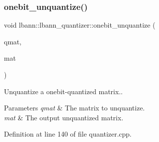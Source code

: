 \subsubsection{\texorpdfstring{onebit\+\_\+unquantize()}{onebit\_unquantize()}\hspace{0.1cm}{\footnotesize\ttfamily [1/2]}}
{\footnotesize\ttfamily void lbann\+::lbann\+\_\+quantizer\+::onebit\+\_\+unquantize (\begin{DoxyParamCaption}\item[{const \hyperlink{classlbann_1_1lbann__quantizer_a399f3f8c393b6021b43e95d1ce6ea28c}{Quantized\+Matrix} \&}]{qmat,  }\item[{\hyperlink{base_8hpp_a68f11fdc31b62516cb310831bbe54d73}{Mat} \&}]{mat }\end{DoxyParamCaption})}

Unquantize a onebit-\/quantized matrix.. 
\begin{DoxyParams}{Parameters}
{\em qmat} & The matrix to unquantize. \\
\hline
{\em mat} & The output unquantized matrix. \\
\hline
\end{DoxyParams}


Definition at line 140 of file quantizer.\+cpp.


